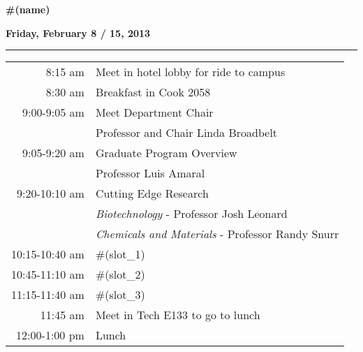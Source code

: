 \documentclass{article}
\begin{document}
\vspace*{0.25\baselineskip}
\textbf{\LARGE{#(name)}}
\vspace*{0.25\baselineskip}

\centerline{\textbf{Friday, February 8 / 15, 2013}}
\vspace*{0.25\baselineskip}
\hrule
\vspace*{0.25\baselineskip}

\hspace{4.6cm}
\begin{tabular}{ r    l }

8:15 am         & Meet in hotel lobby for ride to campus \rule{0cm}{0.5cm} \\

8:30 am         & Breakfast in Cook 2058 \rule{0cm}{0.4cm} \\ 

9:00-9:05 am    & Meet Department Chair \rule{0cm}{0.4cm} \\ 
                & \hspace{5mm} Professor and Chair Linda Broadbelt \\ 

9:05-9:20 am    & Graduate Program Overview \rule{0cm}{0.4cm} \\ 
                & \hspace{5mm} Professor Luis Amaral \\ 

9:20-10:10 am   & Cutting Edge Research \rule{0cm}{0.4cm} \\ 
                & \hspace{5mm} \textit{Biotechnology} - Professor Josh Leonard \\ 
                & \hspace{5mm} \textit{Chemicals and Materials} - Professor Randy Snurr \\

10:15-10:40 am  & #(slot_1) \rule{0cm}{0.4cm} \\ 

10:45-11:10 am  & #(slot_2) \rule{0cm}{0.4cm} \\ 

11:15-11:40 am  & #(slot_3) \rule{0cm}{0.4cm} \\ 

11:45 am        & Meet in Tech E133 to go to lunch \rule{0cm}{0.4cm} \\ 

12:00-1:00 pm   & Lunch \rule{0cm}{0.4cm} \\ 


\end{tabular}
\end{document}
